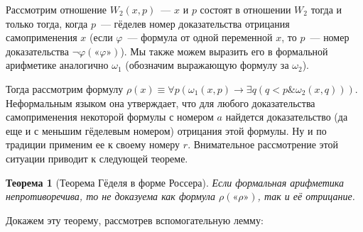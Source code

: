 \documentclass[a4paper,11pt]{article}
\newtheorem{thm}{Теорема}[section]
\theoremstyle{definition}
\newcommand{\amp}{\mathbin{\&}}
\newcommand{\gn}[1]{\text{«}#1\text{»}}
\begin{document}
Рассмотрим отношение $W_2(x, p)$~--- $x$ и $p$ состоят в отношении $W_2$ тогда и
только тогда, когда $p$~--- гёделев номер доказательства отрицания
самоприменения $x$ (если $\varphi$~--- формула от одной переменной $x$, то
$p$~--- номер доказательства $\neg\varphi(\gn{\varphi})$). Мы также можем
выразить его в формальной арифметике аналогично $\omega_1$ (обозначим выражающую
формулу за $\omega_2$).

Тогда рассмотрим формулу $\rho(x) \equiv \forall p(\omega_1(x, p) \to \exists
q(q < p \amp \omega_2(x, q)))$. Неформальным языком она утверждает, что для
любого доказательства самоприменения некоторой формулы с номером $a$ найдется
доказательство (да еще и с меньшим гёделевым номером) отрицания этой формулы. Ну
и по традиции применим ее к своему номеру $r$. Внимательное рассмотрение этой
ситуации приводит к следующей теореме.

\begin{thm}[Теорема Гёделя в форме Россера]
Если формальная арифметика непротиворечива, то не доказуема как формула
$\rho(\gn{\rho})$, так и её отрицание.
\end{thm}

Докажем эту теорему, рассмотрев вспомогательную лемму:
\end{document}
